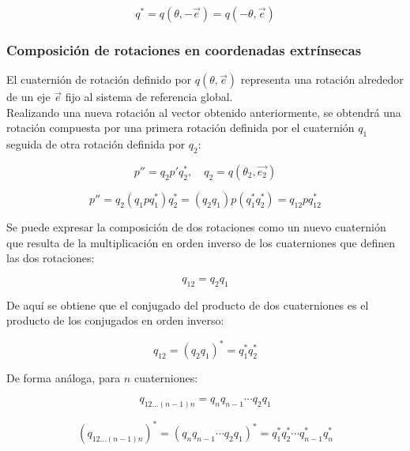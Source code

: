 \documentclass[10pt, a4paper]{report}
\begin{document}
\begin{equation}
q^* = q\left(\theta, -\vec{e} \right) = q\left(-\theta, \vec{e}\right)
\end{equation}

\subsubsection{Composición de rotaciones en coordenadas extrínsecas}

El cuaternión de rotación definido por $q\left(\theta, \vec{e}\right)$ representa una rotación alrededor de un eje $\vec{e}$ fijo al sistema de referencia global.\\

Realizando una nueva rotación al vector obtenido anteriormente, se obtendrá una rotación compuesta por una primera rotación definida por el cuaternión $q_1$ seguida de otra rotación definida por $q_2$:

\begin{equation}
p'' = q_2p'q_2^*, \quad q_2 = q(\theta_2, \vec{e_2})
\end{equation}

\begin{equation}
p'' = q_2(q_1pq_1^*)q_2^* = (q_2q_1)p(q_1^*q_2^*) = q_{12}pq_{12}^*
\end{equation}

Se puede expresar la composición de dos rotaciones como un nuevo cuaternión que resulta de la multiplicación en orden inverso de los cuaterniones que definen las dos rotaciones:

\begin{equation}
q_{12} = q_2 q_1
\end{equation}

De aquí se obtiene que el conjugado del producto de dos cuaterniones es el producto de los conjugados en orden inverso:

\begin{equation}
q_{12} = \left(q_2q_1\right)^* = q_1^*q_2^*
\end{equation}

De forma análoga, para $n$ cuaterniones:

\begin{equation}
q_{12 \dotsc (n-1)n} = q_nq_{n-1} \dotsm q_2q_1
\end{equation}

\begin{equation}
\left( q_{12 \dotsc (n-1)n} \right)^* = \left( q_nq_{n-1} \dotsm q_2q_1 \right)^* = q_1^*q_2^* \dotsm q_{n-1}^*q_n^*
\end{equation}
\end{document}
